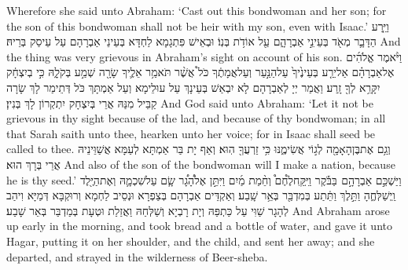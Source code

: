 {Wherefore she said unto Abraham: ‘Cast out this bondwoman and her son; for the son of this bondwoman shall not be heir with my son, even with Isaac.’}{}
{וַיֵּ֧רַע הַדָּבָ֛ר מְאֹ֖ד בְּעֵינֵ֣י אַבְרָהָ֑ם עַ֖ל אוֹדֹ֥ת בְּנֽוֹ׃}
{וּבְאֵישׁ פִּתְגָמָא לַחְדָּא בְּעֵינֵי אַבְרָהָם עַל עֵיסַק בְּרֵיהּ׃}
{And the thing was very grievous in Abraham’s sight on account of his son.}{}
{וַיֹּ֨אמֶר אֱלֹהִ֜ים אֶל\maqqaf אַבְרָהָ֗ם אַל\maqqaf יֵרַ֤ע בְּעֵינֶ֙יךָ֙ עַל\maqqaf הַנַּ֣עַר וְעַל\maqqaf אֲמָתֶ֔ךָ כֹּל֩ אֲשֶׁ֨ר תֹּאמַ֥ר אֵלֶ֛יךָ שָׂרָ֖ה שְׁמַ֣ע בְּקֹלָ֑הּ כִּ֣י בְיִצְחָ֔ק יִקָּרֵ֥א לְךָ֖ זָֽרַע׃}
{וַאֲמַר יְיָ לְאַבְרָהָם לָא יִבְאַשׁ בְּעֵינָךְ עַל עוּלֵימָא וְעַל אַמְתָּךְ כֹּל דְּתֵימַר לָךְ שָׂרָה קַבֵּיל מִנַּהּ אֲרֵי בְּיִצְחָק יִתְקְרוֹן לָךְ בְּנִין׃}
{And God said unto Abraham: ‘Let it not be grievous in thy sight because of the lad, and because of thy bondwoman; in all that Sarah saith unto thee, hearken unto her voice; for in Isaac shall seed be called to thee.}{}
{וְגַ֥ם אֶת\maqqaf בֶּן\maqqaf הָאָמָ֖ה לְג֣וֹי אֲשִׂימֶ֑נּוּ כִּ֥י זַרְעֲךָ֖ הֽוּא׃}
{וְאַף יָת בַּר אַמְתָּא לְעַמָּא אֲשַׁוֵּינֵיהּ אֲרֵי בְּרָךְ הוּא׃}
{And also of the son of the bondwoman will I make a nation, because he is thy seed.’}{}
{וַיַּשְׁכֵּ֣ם אַבְרָהָ֣ם \pasek  בַּבֹּ֡קֶר וַיִּֽקַּֽח\maqqaf לֶ֩חֶם֩ וְחֵ֨מַת מַ֜יִם וַיִּתֵּ֣ן אֶל\maqqaf הָ֠גָ֠ר שָׂ֧ם עַל\maqqaf שִׁכְמָ֛הּ וְאֶת\maqqaf הַיֶּ֖לֶד וַֽיְשַׁלְּחֶ֑הָ וַתֵּ֣לֶךְ וַתֵּ֔תַע בְּמִדְבַּ֖ר בְּאֵ֥ר שָֽׁבַע׃}
{וְאַקְדֵּים אַבְרָהָם בְּצַפְרָא וּנְסֵיב לַחְמָא וְרוּקְבָּא דְּמַיָּא וִיהַב לְהָגָר שַׁוִּי עַל כַּתְפַּהּ וְיָת רָבְיָא וְשַׁלְּחַהּ וַאֲזַלַת וּטְעָת בְּמַדְבַּר בְּאֵר שָׁבַע׃}
{And Abraham arose up early in the morning, and took bread and a bottle of water, and gave it unto Hagar, putting it on her shoulder, and the child, and sent her away; and she departed, and strayed in the wilderness of Beer-sheba.}{}
